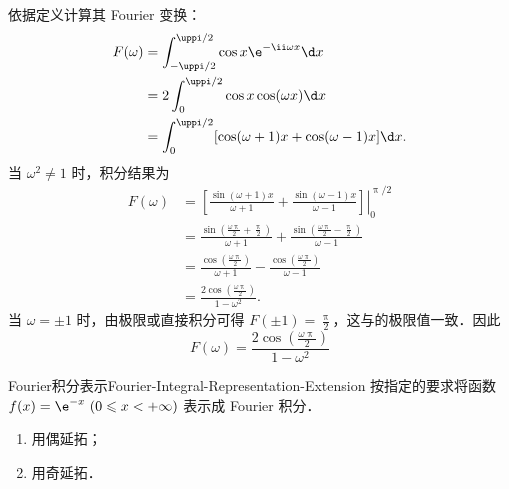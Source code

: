 \begin{solution}

    依据定义计算其 Fourier 变换：
    \begin{equation}\label{eq:p2s3-ft}
        \begin{aligned}
            F(\omega) & = \int_{-\uppi/2}^{\uppi/2} \cos x \e^{-\ii\omega x} \d x    \\
                      & = 2 \int_0^{\uppi/2} \cos x \cos(\omega x) \d x              \\
                      & = \int_0^{\uppi/2} [\cos(\omega+1)x + \cos(\omega-1)x] \d x.
        \end{aligned}
    \end{equation}
    当 $\omega^2 \neq 1$ 时，积分结果为
    \begin{equation}\label{eq:p2s3-int}
        \begin{aligned}
            F(\omega) & = \left. \left[ \frac{\sin(\omega+1)x}{\omega+1} + \frac{\sin(\omega-1)x}{\omega-1} \right] \right|_0^{\uppi/2}                                         \\
                      & = \frac{\sin\left(\frac{\omega\uppi}{2} + \frac{\uppi}{2}\right)}{\omega+1} + \frac{\sin\left(\frac{\omega\uppi}{2} - \frac{\uppi}{2}\right)}{\omega-1} \\
                      & = \frac{\cos\left(\frac{\omega\uppi}{2}\right)}{\omega+1} - \frac{\cos\left(\frac{\omega\uppi}{2}\right)}{\omega-1}                                     \\
                      & = \frac{2\cos\left(\frac{\omega\uppi}{2}\right)}{1-\omega^2}.
        \end{aligned}
    \end{equation}
    当 $\omega = \pm 1$ 时，由极限或直接积分可得 $F(\pm 1) = \frac{\uppi}{2}$，这与的极限值一致．因此
    \begin{equation}
        \boxed{F(\omega) = \frac{2\cos\left(\frac{\omega\uppi}{2}\right)}{1-\omega^2}}
    \end{equation}
\end{solution}

\begin{problem}{Fourier积分表示}{Fourier-Integral-Representation-Extension}
    按指定的要求将函数 $f(x) = \e^{-x} \ (0 \leqslant x < +\infty)$ 表示成 Fourier 积分．
    \begin{enumerate}
        \item 用偶延拓；
        \item 用奇延拓．
    \end{enumerate}
\end{problem}

